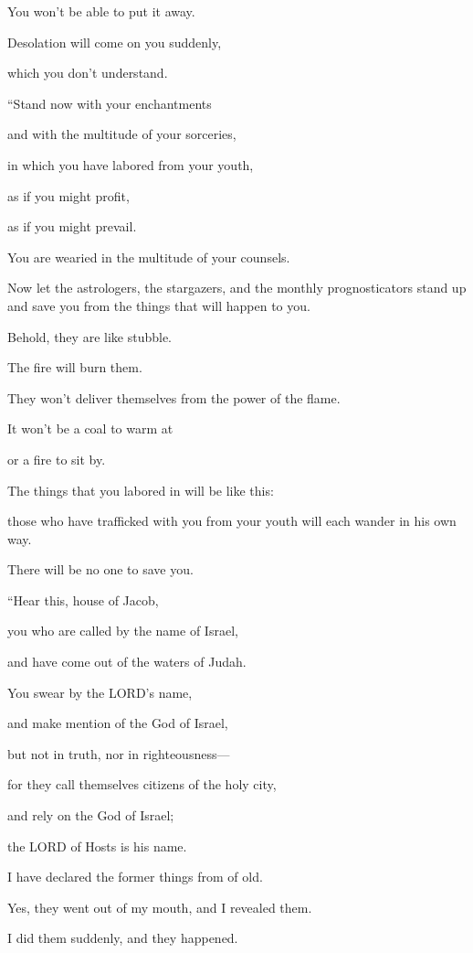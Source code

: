 You won’t be able to put it away.

Desolation will come on you suddenly,

which you don’t understand.


\vspace{\baselineskip} \myverse{}“Stand now with your enchantments

and with the multitude of your sorceries,

in which you have labored from your youth,

as if you might profit,

as if you might prevail.

\myverse{}You are wearied in the multitude of your counsels.

Now let the astrologers, the stargazers, and the monthly prognosticators stand
up and save you from the things that will happen to you.

\myverse{}Behold, they are like stubble.

The fire will burn them.

They won’t deliver themselves from the power of the flame.

It won’t be a coal to warm at

or a fire to sit by.

\myverse{}The things that you labored in will be like this:

those who have trafficked with you from your youth will each wander in his own
way.

There will be no one to save you.


\mychapter{} \myverse*{}“Hear this, house of Jacob,

\quad\quad you who are called by the name of Israel,

and have come out of the waters of Judah.

You swear by the LORD’s name,

and make mention of the God of Israel,

but not in truth, nor in righteousness—

\myverse{}for they call themselves citizens of the holy city,

and rely on the God of Israel;

the LORD of Hosts is his name.

\myverse{}I have declared the former things from of old.

Yes, they went out of my mouth, and I revealed them.

I did them suddenly, and they happened.

